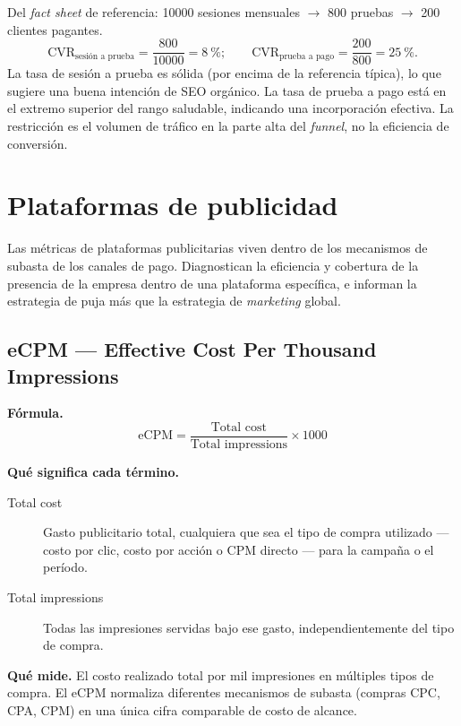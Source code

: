 \begin{example}
Del \emph{fact sheet} de referencia: \num{10000} sesiones mensuales $\to$ \num{800} pruebas
$\to$ \num{200} clientes pagantes.
\[
  \mathrm{CVR}_{\text{sesión a prueba}} = \frac{800}{10000} = \qty{8}{\percent}; \qquad
  \mathrm{CVR}_{\text{prueba a pago}} = \frac{200}{800} = \qty{25}{\percent}.
\]
La tasa de sesión a prueba es sólida (por encima de la referencia típica), lo que sugiere
una buena intención de SEO orgánico. La tasa de prueba a pago está en el extremo superior
del rango saludable, indicando una incorporación efectiva. La restricción es el volumen de
tráfico en la parte alta del \emph{funnel}, no la eficiencia de conversión.
\end{example}


\section{Plataformas de publicidad}

Las métricas de plataformas publicitarias viven dentro de los mecanismos de subasta de los
canales de pago. Diagnostican la eficiencia y cobertura de la presencia de la empresa dentro
de una plataforma específica, e informan la estrategia de puja más que la estrategia de
\emph{marketing} global.

\subsection{eCPM --- Effective Cost Per Thousand Impressions}

\textbf{Fórmula.}
\[
  \mathrm{eCPM} = \frac{\text{Total cost}}{\text{Total impressions}} \times 1000
\]

\textbf{Qué significa cada término.}
\begin{description}
  \item[Total cost] Gasto publicitario total, cualquiera que sea el tipo de compra utilizado
    --- costo por clic, costo por acción o CPM directo --- para la campaña o el período.
  \item[Total impressions] Todas las impresiones servidas bajo ese gasto, independientemente
    del tipo de compra.
\end{description}

\textbf{Qué mide.} El costo realizado total por mil impresiones en múltiples tipos de compra.
El eCPM normaliza diferentes mecanismos de subasta (compras CPC, CPA, CPM) en una única
cifra comparable de costo de alcance.

